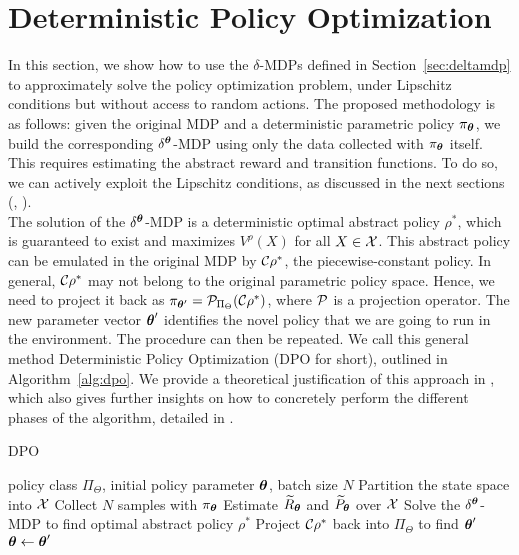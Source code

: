 \section{Deterministic Policy Optimization}\label{sec:algo}
In this section, we show how to use the $\delta$-MDPs defined in Section~\ref{sec:deltamdp} to approximately solve the policy optimization problem, under Lipschitz conditions but without access to random actions.
%
The proposed methodology is as follows: given the original \ac{MDP} and a deterministic parametric policy $\pi_{\boldsymbol{\theta}}$, we build the corresponding  $\delta^{\boldsymbol{\theta}}$-\ac{MDP} using only the data collected with $\pi_{\boldsymbol{\theta}}$ itself. This requires estimating the abstract reward and transition functions. To do so, we can actively exploit the Lipschitz conditions, as discussed in the next sections (, ).\\
\newline
The solution of the $\delta^{\boldsymbol{\theta}}$-\ac{MDP} is a deterministic optimal abstract policy $\rho^{*}$, which is guaranteed to exist and maximizes $V^{\rho}(X)$ for all $X\in\mathcal{X}$. This abstract policy can be emulated in the original \ac{MDP} by $\mathcal{C}\rho^{*}$, the piecewise-constant policy. In general, $\mathcal{C}\rho^{*}$ may not belong to the original parametric policy space. Hence, we need to project it back as $\pi_{\boldsymbol{\theta}'} = \mathcal{P}_{\Pi_{\Theta}}(\mathcal{C}\rho^{*})$, where $\mathcal{P}$ is a projection operator. The new parameter vector $\boldsymbol{\theta}'$ identifies the novel policy that we are going to run in the environment. The procedure can then be repeated. We call this general method Deterministic Policy Optimization (\ac{DPO} for short), outlined in Algorithm~\ref{alg:dpo}.
We provide a theoretical justification of this approach in , which also gives further insights on how to concretely perform the different phases of the algorithm, detailed in . 
%
%
\begin{algorithm}[t]
	\caption{DPO}
	\label{alg:dpo}
	\begin{algorithmic}[1]
		 policy class $\Pi_{\Theta}$, initial policy parameter $\boldsymbol{\theta}$, batch size $N$
		\STATE Partition the state space into $\mathcal{X}$
		\STATE Collect $N$ samples with $\pi_{\boldsymbol{\theta}}$ 
		\STATE Estimate $\widetilde{R}_{\boldsymbol{\theta}}$ and $\widetilde{P}_{\boldsymbol{\theta}}$ over $\mathcal{X}$
		\STATE Solve the $\delta^{\boldsymbol{\theta}}$-MDP to find optimal abstract policy $\rho^{*}$
		\STATE Project $\mathcal{C}\rho^{*}$ back into $\Pi_{\Theta}$ to find $\boldsymbol{\theta}'$
		\STATE $\boldsymbol{\theta}\gets\boldsymbol{\theta}'$
		\ENDFOR
	\end{algorithmic}
\end{algorithm}
%

